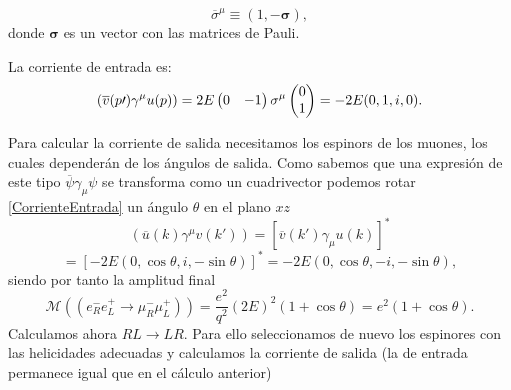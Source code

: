 \documentclass{article}
\theoremstyle{plain}
\theoremstyle{definition}
\begin{document}
	\[\overline{\sigma}^{\mu} \equiv \left(
	1 , -\boldsymbol{\sigma}
	\right), \] donde \(\boldsymbol{\sigma}\) es un vector con las matrices de Pauli. \par \noindent La corriente de entrada es:
	\begin{equation}\label{CorrienteEntrada}
	\left(\overline{v}(p\prime)\gamma^{\mu}u(p) \right) =2E\left(\begin{array}{@{}cc@{}}
	0 & -1
	\end{array} \right)\sigma^{\mu}\left(\begin{array}{@{}c@{}}
	0 \\
	1
	\end{array} \right) = -2E(0,1,i,0)\text{.}
	\end{equation} 
	
	Para calcular la corriente de salida necesitamos los espinors de los muones, los cuales dependerán de los ángulos de salida. Como sabemos que una expresión de este tipo \(\overline{\psi}\gamma_{\mu}\psi \) se transforma como un cuadrivector podemos rotar \eqref{CorrienteEntrada} un ángulo \(\theta \) en el plano \(xz\)
	\[ \left(\overline{u}(k)\gamma^{\mu}v(k\prime) \right) = [\overline{v}(k\prime)\gamma_{\mu}u(k)]^*\]
	\[
	=[-2E(0,\cos\theta, i,-\sin\theta)]^* = -2E(0,\cos\theta, -i,-\sin\theta),
	\]
	siendo por tanto la amplitud final
	\[\mathcal{M}((e_R^-e_L^+ \rightarrow \mu_R^-\mu_L^+)) = \frac{e^2}{q^2}(2E)^2(1+\cos\theta) = e^2(1+\cos\theta)\text{.} \] 
	Calculamos ahora \(RL\rightarrow LR\). Para ello seleccionamos de nuevo los espinores con las helicidades adecuadas y calculamos la corriente de salida (la de entrada permanece igual que en el cálculo anterior)
	
\end{document}
